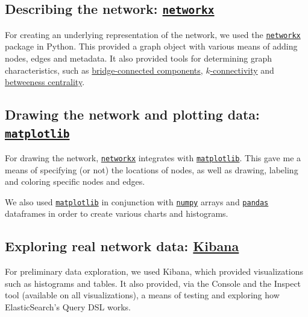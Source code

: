 \documentclass{finalreport}
\begin{document}
\subsection{Describing the network: \texttt{\href{https://networkx.github.io/}{networkx}}}\label{nx}

For creating an underlying representation of the network, we used the \texttt{\href{https://networkx.github.io/}{networkx}} package in Python. This provided a graph object with various means of adding nodes, edges and metadata. It also provided tools for determining graph characteristics, such as \href{https://networkx.github.io/documentation/stable/reference/algorithms/generated/networkx.algorithms.connectivity.edge_kcomponents.bridge_components.html}{bridge-connected components}, \href{https://networkx.github.io/documentation/stable/reference/algorithms/generated/networkx.algorithms.connectivity.edge_augmentation.k_edge_augmentation.html#networkx.algorithms.connectivity.edge_augmentation.k_edge_augmentation}{$k$-connectivity} and \href{https://networkx.github.io/documentation/stable/reference/algorithms/centrality.html}{betweeness centrality}.

\subsection{Drawing the network and plotting data: \texttt{\href{https://matplotlib.org/}{matplotlib}}}\label{mpl}

For drawing the network, \texttt{\href{https://networkx.github.io/}{networkx}} integrates with \texttt{\href{https://matplotlib.org/}{matplotlib}}. This gave me a means of specifying (or not) the locations of nodes, as well as drawing, labeling and coloring specific nodes and edges.

We also used \texttt{\href{https://matplotlib.org/}{matplotlib}} in conjunction with \texttt{\href{https://numpy.org/}{numpy}} arrays and \texttt{\href{https://pandas.pydata.org/}{pandas}} dataframes in order to create various charts and histograms.

\subsection{Exploring real network data: \href{https://atlas-kibana.mwt2.org/}{Kibana}}\label{kibana}

For preliminary data exploration, we used Kibana, which provided visualizations such as histograms and tables. It also provided, via the Console and the Inspect tool (available on all visualizations), a means of testing and exploring how ElasticSearch's Query DSL works.
\end{document}
